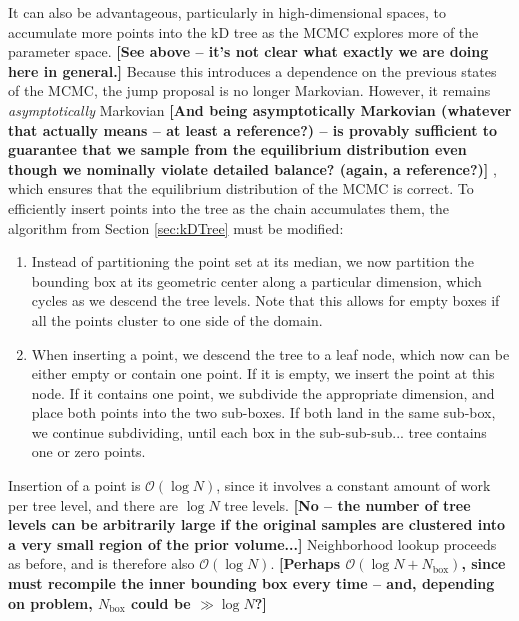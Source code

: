\documentclass{iopart}
\newcommand{\Nbox}{N_\mathrm{box}}
\newcommand{\ilya}[1]{{\color{red} \bf #1}}
\newcommand{\order}[1]{\mathcal{O}\left( #1 \right)}
\begin{document}
It can also be advantageous, particularly in high-dimensional spaces,
to accumulate more points into the kD tree as the MCMC explores more
of the parameter space.  \ilya{[See above -- it's not clear what exactly we are doing here in general.]}
Because this introduces a dependence on the
previous states of the MCMC, the jump proposal is no longer
Markovian.  However, it remains \emph{asymptotically} Markovian \ilya{[And being asymptotically Markovian (whatever that actually means -- at least a reference?) -- is provably sufficient to guarantee that we sample from the equilibrium distribution even though we nominally violate detailed balance? (again, a reference?)]} , which
ensures that the equilibrium distribution of the MCMC is correct.  To
efficiently insert points into the tree as the chain accumulates them,
the algorithm from Section \ref{sec:kDTree} must be modified:
\begin{enumerate}
\item Instead of partitioning the point set at its median, we now
  partition the bounding box at its geometric center along a
  particular dimension, which cycles as we descend the tree levels.
  Note that this allows for empty boxes if all the points cluster to
  one side of the domain.
\item When inserting a point, we descend the tree to a leaf node,
  which now can be either empty or contain one point.  If it is empty,
  we insert the point at this node.  If it contains one point, we
  subdivide the appropriate dimension, and place both points into the
  two sub-boxes.  If both land in the same sub-box, we continue
  subdividing, until each box in the sub-sub-sub... tree contains one
  or zero points.
\end{enumerate}
Insertion of a point is $\order{\log N}$, since it involves a constant
amount of work per tree level, and there are $\log N$ tree levels.  \ilya{[No -- the number of tree levels can be arbitrarily large if the original samples are clustered into a very small region of the prior volume...]}
Neighborhood lookup proceeds as before, and is therefore also
$\order{\log N}$.  \ilya{[Perhaps $\order{\log N + \Nbox}$, since must recompile the inner bounding box every time -- and, depending on problem, $\Nbox$ could be $\gg \log N$?]}
\end{document}
